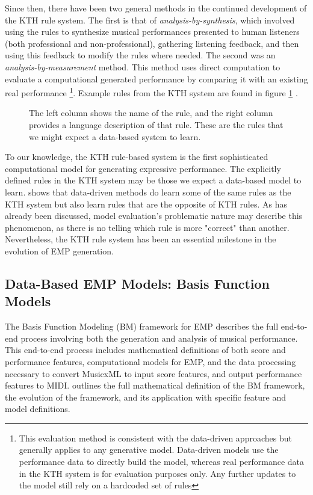 Since then, there have been two general methods in the continued development of the KTH rule system. The first is that of \emph{analysis-by-synthesis}, which involved using the rules to synthesize musical performances presented to human listeners (both professional and non-professional), gathering listening feedback, and then using this feedback to modify the rules where needed. The second was an \emph{analysis-by-measurement} method. This method uses direct computation to evaluate a computational generated performance by comparing it with an existing real performance \footnote{This evaluation method is consistent with the data-driven approaches but generally applies to any generative model. Data-driven models use the performance data to directly build the model, whereas real performance data in the KTH system is for evaluation purposes only. Any further updates to the model still rely on a hardcoded set of rules}. Example rules from the KTH system are found in figure \ref{fig:kth-rules} . 

\begin{figure}
    \centering
    \caption{The left column shows the name of the rule, and the right column provides a language description of that rule. These are the rules that we might expect a data-based system to learn.}
    \label{fig:kth-rules}
\end{figure}

To our knowledge, the KTH rule-based system is the first sophisticated computational model for generating expressive performance. The explicitly defined rules in the KTH system may be those we expect a data-based model to learn. \citet{widmer2002machine} shows that data-driven methods do learn some of the same rules as the KTH system but also learn rules that are the opposite of KTH rules. As has already been discussed, model evaluation's problematic nature may describe this phenomenon, as there is no telling which rule is more "correct" than another. Nevertheless, the KTH rule system has been an essential milestone in the evolution of EMP generation. 

\subsection{Data-Based EMP Models: Basis Function Models}\label{sec:data-based}
The Basis Function Modeling (BM) framework for EMP describes the full end-to-end process involving both the generation and analysis of musical performance. This end-to-end process includes mathematical definitions of both score and performance features, computational models for EMP, and the data processing necessary to convert MusicxML to input score features, and output performance features to MIDI. \citet{eduardo2018computational} outlines the full mathematical definition of the BM framework, the evolution of the framework, and its application with specific feature and model definitions.

